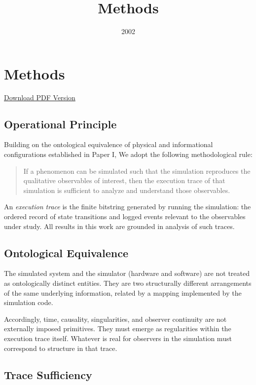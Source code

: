 \documentclass[11pt]{article}
\title{Methods}
\date{2002}
\begin{document}
\maketitle

\section*{Methods}

\ifdefined\ishtml
\begin{center}
\small \href{methods.pdf}{Download PDF Version}
\end{center}
\fi

\subsection*{Operational Principle}

Building on the ontological equivalence of physical and informational configurations established in Paper I, We adopt the following methodological rule:

\begin{quote}
If a phenomenon can be simulated such that the simulation reproduces the qualitative observables of interest, then the execution trace of that simulation is sufficient to analyze and understand those observables.
\end{quote}

An \emph{execution trace} is the finite bitstring generated by running the simulation: the ordered record of state transitions and logged events relevant to the observables under study. All results in this work are grounded in analysis of such traces.

\subsection*{Ontological Equivalence}

The simulated system and the simulator (hardware and software) are not treated as ontologically distinct entities. They are two structurally different arrangements of the same underlying information, related by a mapping implemented by the simulation code.

Accordingly, time, causality, singularities, and observer continuity are not externally imposed primitives. They must emerge as regularities within the execution trace itself. Whatever is real for observers in the simulation must correspond to structure in that trace.

\subsection*{Trace Sufficiency}
\end{document}
